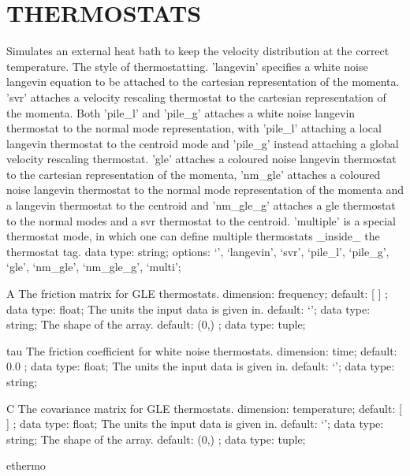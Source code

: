 \section{THERMOSTATS}
\label{THERMOSTATS}
\begin{ipifield}{}%
{Simulates an external heat bath to keep the velocity distribution at the correct temperature.}%
{}%
{%
{The style of thermostatting. 'langevin' specifies a white noise langevin equation to be attached to the cartesian representation of the momenta. 'svr' attaches a velocity rescaling thermostat to the cartesian representation of the momenta. Both 'pile\_l' and 'pile\_g' attaches a white noise langevin thermostat to the normal mode representation, with 'pile\_l' attaching a local langevin thermostat to the centroid mode and 'pile\_g' instead attaching a global velocity rescaling thermostat. 'gle' attaches a coloured noise langevin thermostat to the cartesian representation of the momenta, 'nm\_gle' attaches a coloured noise langevin thermostat to the normal mode representation of the momenta and a langevin thermostat to the centroid and 'nm\_gle\_g' attaches a gle thermostat to the normal modes and a svr thermostat to the centroid.  'multiple' is a special thermostat mode, in which one can define multiple thermostats \_inside\_ the thermostat tag.}%
{data type: string; options: `', `langevin', `svr', `pile\_l', `pile\_g', `gle', `nm\_gle', `nm\_gle\_g', `multi'; }%
}
\begin{ipifield}{A}%
{The friction matrix for GLE thermostats.}%
{dimension: frequency; default:  [ ] ; data type: float; }%
{%
{The units the input data is given in.}%
{default: `'; data type: string; }%
%
{The shape of the array.}%
{default:  (0,) ; data type: tuple; }%
}
\end{ipifield}
\begin{ipifield}{tau}%
{The friction coefficient for white noise thermostats.}%
{dimension: time; default:  0.0 ; data type: float; }%
{%
{The units the input data is given in.}%
{default: `'; data type: string; }%
}
\end{ipifield}
\begin{ipifield}{C}%
{The covariance matrix for GLE thermostats.}%
{dimension: temperature; default:  [ ] ; data type: float; }%
{%
{The units the input data is given in.}%
{default: `'; data type: string; }%
%
{The shape of the array.}%
{default:  (0,) ; data type: tuple; }%
}
\end{ipifield}
\begin{ipifield}{ethermo}%

\end{ipifield}
\end{ipifield}
